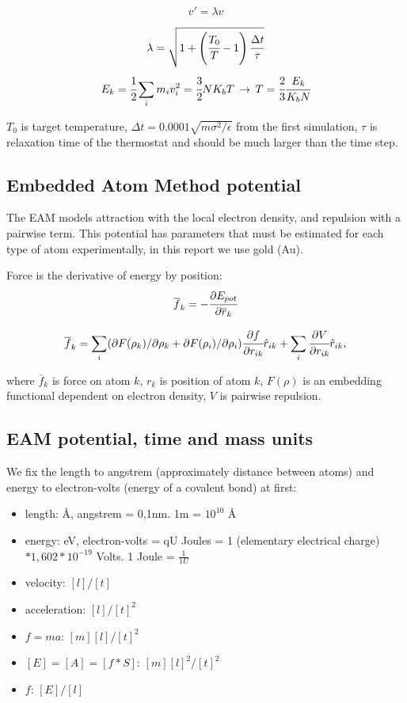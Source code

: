 \documentclass[12pt,a4paper]{article}
\newcommand{\infers}{\,\to\,}
\newcommand{\mat}[1]{\overline{#1}}
\begin{document}
\[ v' = \lambda v \]

\[ \lambda = \sqrt{1 + \left(\cfrac{T_0}{T}-1 \right) \cfrac{\Delta t}{\tau} }  \]
\[ E_k = \cfrac{1}{2} \sum_i m_i v_i^2 = \cfrac{3}{2} N K_b T \infers T = \cfrac{2}{3} \cfrac{E_k}{K_b N} \]

\(T_0\) is target temperature, \(\Delta t = 0.0001 \sqrt{m\sigma^2 / \epsilon} \) from the first simulation, \( \tau \) is relaxation time of the thermostat and should be much larger than the time step.

\subsection*{Embedded Atom Method potential}

The EAM models attraction with the local electron density, and repulsion with a pairwise term. This potential has parameters that must be estimated for each type of atom experimentally, in this report we use gold (Au).

Force is the derivative of energy by position:
\[
\mat{f}_k = -\cfrac{\partial E_{pot}}{\partial \mat{r}_k}
\]

\[
\mat{f}_k = \sum_i ( \partial F(\rho_k) / \partial \rho_k + \partial F(\rho_i) / \partial \rho_i )  \cfrac{\partial f}{\partial r_{ik}} \hat{r}_{ik} +
\sum_i \cfrac{\partial V}{\partial r_{ik}} \hat{r}_{ik},
\]

where $\mat{f}_k$ is force on atom $k$, $r_k$ is position of atom $k$, $F(\rho)$ is an embedding functional dependent on electron density, $V$ is pairwise repulsion.

\subsection*{EAM potential, time and mass units}

We fix the length to angstrem (approximately distance between atoms) and energy to electron-volts (energy of a covalent bond) at first:

\begin{itemize}
	\item length: Å, angstrem = 0,1nm. 1m = $10^{10}$ Å
	\item energy: eV, electron-volts = qU Joules = 1 (elementary electrical charge) $* 1,602 * 10^{-19}$ Volts. 1 Joule = $\frac{1}{1U}$
	\item velocity: $[l]/[t]$
	\item acceleration: $[l]/[t]^2$
	\item $f=ma$:       $[m][l]/[t]^2$
	\item $[E]=[A]=[f*S]$:    $[m][l]^2/[t]^2$
	\item $f$: $[E]/[l]$
\end{itemize}
\end{document}

